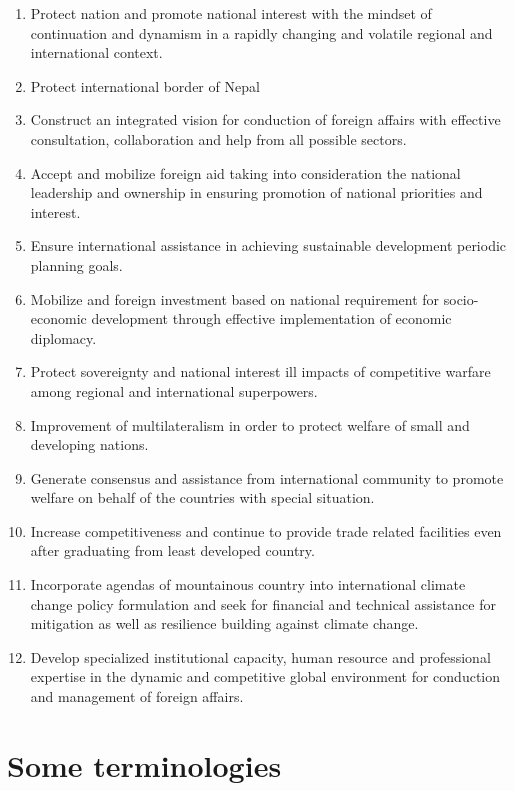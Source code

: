 \documentclass[
  openany]{book}
\providecommand{\tightlist}{%
  \setlength{\itemsep}{0pt}\setlength{\parskip}{0pt}}
\begin{document}
\begin{enumerate}
\def\labelenumi{\arabic{enumi}.}
\tightlist
\item
  Protect nation and promote national interest with the mindset of continuation and dynamism in a rapidly changing and volatile regional and international context.
\item
  Protect international border of Nepal
\item
  Construct an integrated vision for conduction of foreign affairs with effective consultation, collaboration and help from all possible sectors.
\item
  Accept and mobilize foreign aid taking into consideration the national leadership and ownership in ensuring promotion of national priorities and interest.
\item
  Ensure international assistance in achieving sustainable development periodic planning goals.
\item
  Mobilize and foreign investment based on national requirement for socio-economic development through effective implementation of economic diplomacy.
\item
  Protect sovereignty and national interest ill impacts of competitive warfare among regional and international superpowers.
\item
  Improvement of multilateralism in order to protect welfare of small and developing nations.
\item
  Generate consensus and assistance from international community to promote welfare on behalf of the countries with special situation.
\item
  Increase competitiveness and continue to provide trade related facilities even after graduating from least developed country.
\item
  Incorporate agendas of mountainous country into international climate change policy formulation and seek for financial and technical assistance for mitigation as well as resilience building against climate change.
\item
  Develop specialized institutional capacity, human resource and professional expertise in the dynamic and competitive global environment for conduction and management of foreign affairs.
\end{enumerate}

\hypertarget{some-terminologies}{%
\section{Some terminologies}\label{some-terminologies}}
\end{document}
